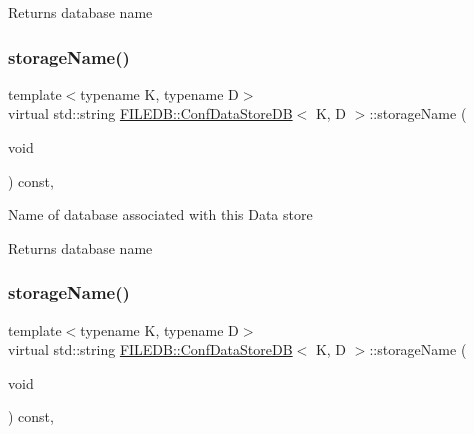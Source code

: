 \begin{DoxyReturn}{Returns}
database name 
\end{DoxyReturn}
\mbox{\label{classFILEDB_1_1ConfDataStoreDB_acac74e3143398de6c5da068f37a762ee}} 
\subsubsection{\texorpdfstring{storageName()}{storageName()}\hspace{0.1cm}{\footnotesize\ttfamily [2/3]}}
{\footnotesize\ttfamily template$<$typename K, typename D$>$ \\
virtual std\+::string \mbox{\hyperlink{classFILEDB_1_1ConfDataStoreDB}{F\+I\+L\+E\+D\+B\+::\+Conf\+Data\+Store\+DB}}$<$ K, D $>$\+::storage\+Name (\begin{DoxyParamCaption}\item[{void}]{ }\end{DoxyParamCaption}) const\hspace{0.3cm}{\ttfamily [inline]}, {\ttfamily [virtual]}}

Name of database associated with this Data store

\begin{DoxyReturn}{Returns}
database name 
\end{DoxyReturn}
\mbox{\label{classFILEDB_1_1ConfDataStoreDB_acac74e3143398de6c5da068f37a762ee}} 
\subsubsection{\texorpdfstring{storageName()}{storageName()}\hspace{0.1cm}{\footnotesize\ttfamily [3/3]}}
{\footnotesize\ttfamily template$<$typename K, typename D$>$ \\
virtual std\+::string \mbox{\hyperlink{classFILEDB_1_1ConfDataStoreDB}{F\+I\+L\+E\+D\+B\+::\+Conf\+Data\+Store\+DB}}$<$ K, D $>$\+::storage\+Name (\begin{DoxyParamCaption}\item[{void}]{ }\end{DoxyParamCaption}) const\hspace{0.3cm}{\ttfamily [inline]}, {\ttfamily [virtual]}}

